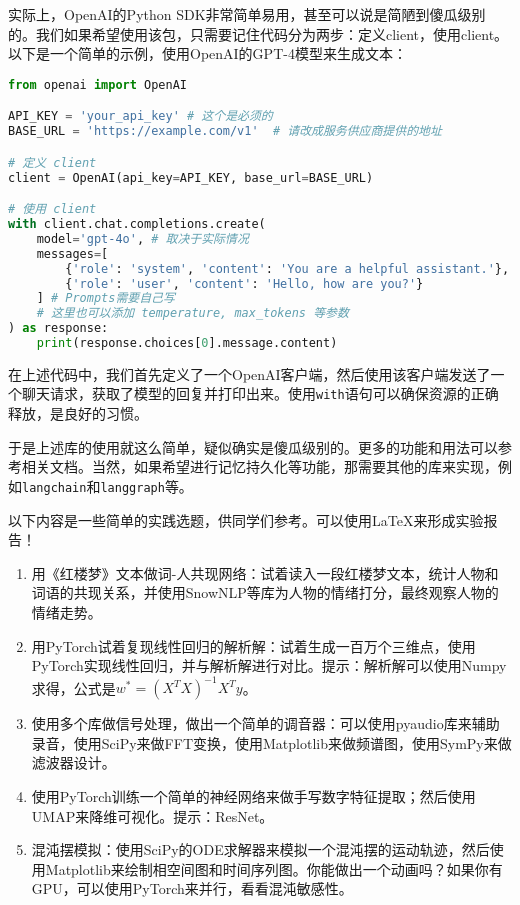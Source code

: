 \documentclass[../main.tex]{subfiles}
\begin{document}
实际上，OpenAI的Python SDK非常简单易用，甚至可以说是简陋到傻瓜级别的。我们如果希望使用该包，只需要记住代码分为两步：定义client，使用client。以下是一个简单的示例，使用OpenAI的GPT-4模型来生成文本：
\begin{lstlisting}[language=python]
from openai import OpenAI

API_KEY = 'your_api_key' # 这个是必须的
BASE_URL = 'https://example.com/v1'  # 请改成服务供应商提供的地址

# 定义 client
client = OpenAI(api_key=API_KEY, base_url=BASE_URL)

# 使用 client
with client.chat.completions.create(
    model='gpt-4o', # 取决于实际情况
    messages=[
        {'role': 'system', 'content': 'You are a helpful assistant.'},
        {'role': 'user', 'content': 'Hello, how are you?'}
    ] # Prompts需要自己写
    # 这里也可以添加 temperature, max_tokens 等参数
) as response:
    print(response.choices[0].message.content)
\end{lstlisting}

在上述代码中，我们首先定义了一个OpenAI客户端，然后使用该客户端发送了一个聊天请求，获取了模型的回复并打印出来。使用\texttt{with}语句可以确保资源的正确释放，是良好的习惯。

于是上述库的使用就这么简单，疑似确实是傻瓜级别的。更多的功能和用法可以参考相关文档。当然，如果希望进行记忆持久化等功能，那需要其他的库来实现，例如\texttt{langchain}和\texttt{langgraph}等。


\begin{thinking}
  以下内容是一些简单的实践选题，供同学们参考。可以使用LaTeX来形成实验报告！
  \begin{enumerate}
    \item 用《红楼梦》文本做词-人共现网络：试着读入一段红楼梦文本，统计人物和词语的共现关系，并使用SnowNLP等库为人物的情绪打分，最终观察人物的情绪走势。
    \item 用PyTorch试着复现线性回归的解析解：试着生成一百万个三维点，使用PyTorch实现线性回归，并与解析解进行对比。提示：解析解可以使用Numpy求得，公式是$w^* = (X^TX)^{-1}X^Ty$。
    \item 使用多个库做信号处理，做出一个简单的调音器：可以使用pyaudio库来辅助录音，使用SciPy来做FFT变换，使用Matplotlib来做频谱图，使用SymPy来做滤波器设计。
    \item 使用PyTorch训练一个简单的神经网络来做手写数字特征提取；然后使用UMAP来降维可视化。提示：ResNet。
    \item 混沌摆模拟：使用SciPy的ODE求解器来模拟一个混沌摆的运动轨迹，然后使用Matplotlib来绘制相空间图和时间序列图。你能做出一个动画吗？如果你有GPU，可以使用PyTorch来并行，看看混沌敏感性。
  \end{enumerate}
\end{thinking}
\end{document}
